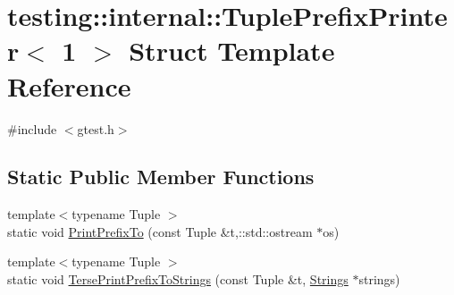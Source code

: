 \hypertarget{structtesting_1_1internal_1_1_tuple_prefix_printer_3_011_01_4}{\section{testing\-:\-:internal\-:\-:Tuple\-Prefix\-Printer$<$ 1 $>$ Struct Template Reference}
\label{structtesting_1_1internal_1_1_tuple_prefix_printer_3_011_01_4}
}


{\ttfamily \#include $<$gtest.\-h$>$}

\subsection*{Static Public Member Functions}
\begin{DoxyCompactItemize}
\item 
{\footnotesize template$<$typename Tuple $>$ }\\static void \hyperlink{structtesting_1_1internal_1_1_tuple_prefix_printer_3_011_01_4_a90fef286a721920e7269291efbf9e23e}{Print\-Prefix\-To} (const Tuple \&t,\-::std\-::ostream $\ast$os)
\item 
{\footnotesize template$<$typename Tuple $>$ }\\static void \hyperlink{structtesting_1_1internal_1_1_tuple_prefix_printer_3_011_01_4_acc513062684bbdd514a294f79a7980cc}{Terse\-Print\-Prefix\-To\-Strings} (const Tuple \&t, \hyperlink{namespacetesting_1_1internal_a7706b17f05f4b49e351b052ae4e05073}{Strings} $\ast$strings)
\end{DoxyCompactItemize}


